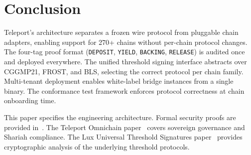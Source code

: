 \section{Conclusion}

\label{sec:conclusion}

Teleport's architecture separates a frozen wire protocol from pluggable chain adapters, enabling support for 270+ chains without per-chain protocol changes. The four-tag proof format (\texttt{DEPOSIT}, \texttt{YIELD}, \texttt{BACKING}, \texttt{RELEASE}) is audited once and deployed everywhere. The unified threshold signing interface abstracts over CGGMP21, FROST, and BLS, selecting the correct protocol per chain family. Multi-tenant deployment enables white-label bridge instances from a single binary. The conformance test framework enforces protocol correctness at chain onboarding time.

This paper specifies the engineering architecture. Formal security proofs are provided in~\cite{luxproof-teleport}. The Teleport Omnichain paper~\cite{luxtp-omni2025} covers sovereign governance and Shariah compliance. The Lux Universal Threshold Signatures paper~\cite{luxthreshold2025} provides cryptographic analysis of the underlying threshold protocols.


